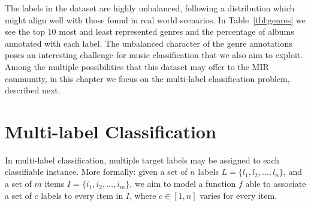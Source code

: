 The labels in the dataset are highly unbalanced, following a distribution which might align well with those found in real world scenarios. 
In Table~\ref{tbl:genres} we see the top 10 most and least represented genres and the percentage of albums annotated with each label.
The unbalanced character of the genre annotations poses an interesting challenge for music classification that we also aim to exploit. 
Among the multiple possibilities that this dataset may offer to the MIR community, in this chapter we focus on the multi-label classification problem, described next.



\section{Multi-label Classification}\label{sec:multi-class:multilabel}


In multi-label classification, multiple target labels may be assigned to each classifiable instance. %
More formally: given a set of $n$ labels $L = \{l_1,l_2,\ldots,l_n\}$, and a set of $m$ items $I = \{i_1,i_2,\ldots,i_m\}$, we aim to model a function $f$ able to associate a set of $c$ labels to every item in $I$, where $c \in [1, n]$ varies for every item. %

